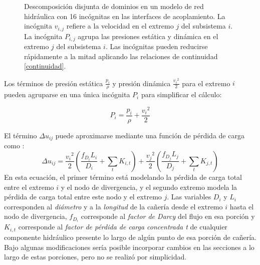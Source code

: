\begin{figure}
\caption[Descomposición disjunta de dominios en el modelado de redes hidráulicas]
{Descomposición disjunta de dominios en un modelo de red hidráulica con 16 incógnitas en las interfaces de acoplamiento.
La incógnita $v_{i,j}$ refiere a la velocidad en el extremo $j$ del subsistema $i$.
La incógnita $P_{i,j}$ agrupa las presiones estática y dinámica en el extremo $j$ del subsistema $i$.
Las incógnitas pueden reducirse rápidamente a la mitad aplicando las relaciones de continuidad \ref{continuidad}.}
\label{net16}
\end{figure}

Los términos de presión estática $\frac{p_i}{\rho}$ y presión dinámica $\frac{{v_i}^2}{2}$ para el extremo $i$ pueden agruparse en una única incógnita $P_i$ para simplificar el cálculo:

\begin{equation}
P_i = \frac{p_i}{\rho} + \frac{{v_i}^2}{2}
\label{p-eyd}
\end{equation}

El término $\Delta u_{ij}$ puede aproximarse mediante una función de pérdida de carga como \cite{white}:
\begin{equation}
\Delta u_{ij} = \frac{{v_i}^2}{2} \left ( \frac{f_{D_i} L_{i}}{D_i} + \sum_t K_{i,t} \right ) + \frac{{v_j}^2}{2} \left ( \frac{f_{D_j} L_{j}}{D_j} + \sum_t K_{j,t} \right )
\label{du}
\end{equation}
En esta ecuación, el primer término está modelando la pérdida de carga total entre el extremo $i$ y el nodo de divergencia,
y el segundo extremo modela la pérdida de carga total entre este nodo y el extremo $j$.
Las variables $D_i$ y $L_i$ corresponden al \textit{diámetro} y a la \textit{longitud} de la cañería desde el extremo $i$ hasta el nodo de divergencia,
$f_{D_i}$ corresponde al \textit{factor de Darcy} del flujo en esa porción
y $K_{i,t}$ corresponde al \textit{factor de pérdida de carga concentrada t} de cualquier componente hidráulico presente lo largo de algún punto de esa porción de cañería.
Bajo algunas modificaciones sería posible incorporar cambios en las secciones a lo largo de estas porciones, pero no se realizó por simplicidad.

